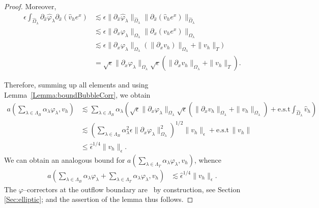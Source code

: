 \documentclass{article}
\newcommand{\est}{\text{\,e.s.t.}\xspace}
\newcommand{\T}{\ensuremath{\mathcal{T}}\xspace}
\newcommand{\summLA}[1][{}]{\ensuremath{\sum_{\lambda\in\Lambda_{#1}}\alpha_\lambda}}
\begin{document}
\begin{proof}
Moreover, 
\begin{equation*}
    \begin{aligned}
\epsilon \int_{\hat{\Omega}_\lambda} \partial_{\hat{x}} \hat{\varphi}_\lambda\partial_{\hat{x}}(\hat{v}_he^x) 
& \lesssim
     \epsilon \|\partial_{\hat{x}}\hat{\varphi}_\lambda\|_{\hat{\Omega}_\lambda} \|\partial_{\hat{x}} (\hat{v}_he^x) \|_{\hat{\Omega}_\lambda}\\
     & \lesssim
    \epsilon \|\partial_x \varphi_\lambda\|_{\Omega_\lambda}\|\partial_x (v_he^x) \|_{\Omega_\lambda}\\
     & \lesssim
     \epsilon \|\partial_x \varphi_\lambda\|_{\Omega_\lambda}(\|\partial_x v_h) \|_{\Omega_\lambda}+ \|v_h \|_T)\\
      &=  \sqrt{\epsilon} \|\partial_x \varphi_\lambda\|_{\Omega_\lambda}\sqrt{\epsilon}( \|\partial_x v_h \|_{\Omega_\lambda}+
    \|v_h \|_T).
    \end{aligned}
\end{equation*}

Therefore, summing up all elements and using Lemma~\ref{Lemma:boundBubbleCorr}, we obtain
\begin{equation*}
 \begin{aligned}
a(\summLA[B]\varphi_\lambda,v_h) &\lesssim 
    \summLA[B]\left(\sqrt{\epsilon} \|\partial_x \varphi_\lambda\|_{\Omega_\lambda}\sqrt{\epsilon}( \|\partial_x v_h \|_{\Omega_\lambda}+
        \|v_h \|_{\Omega_\lambda})
              + \text{e.s.t}\int_{\hat{\Omega}_\lambda}\hat{v}_h\right)\\
    &\lesssim \left(
    \sum_{\lambda\in\Lambda_{B}}\alpha_\lambda^2\epsilon
    \|\partial_x \varphi_\lambda\|_{\Omega_\lambda}^2
    \right)^{1/2}\|v_h\|_\epsilon 
    + 
    \text{e.s.t} \, \| v_h \| %
    \\
    & \le \hat{\epsilon}^{1/4}\|v_h\|_{\epsilon}.  
 \end{aligned}
\end{equation*}
We can obtain an analogous bound for $a(\summLA[T]\varphi_\lambda,v_h)$, whence
\begin{equation*}
 \begin{aligned}
a(\summLA[B]\varphi_\lambda+\summLA[T]\varphi_\lambda,v_h) 
&\lesssim 
     \hat{\epsilon}^{1/4}\|v_h\|_{\epsilon}.  
 \end{aligned}
\end{equation*}
The $\varphi$--correctors at the outflow boundary are \est\ by construction, see Section \ref{Sec:elliptic}; and the assertion of the lemma thus follows.
\end{proof}
\end{document}
